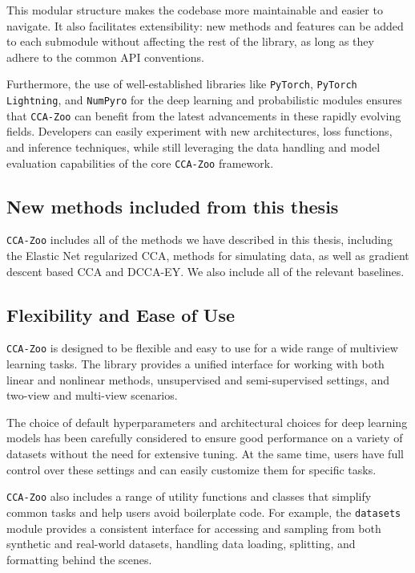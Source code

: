 This modular structure makes the codebase more maintainable and easier to navigate. It also facilitates extensibility: new methods and features can be added to each submodule without affecting the rest of the library, as long as they adhere to the common API conventions.

Furthermore, the use of well-established libraries like \texttt{PyTorch}, \texttt{PyTorch Lightning}, and \texttt{NumPyro} for the deep learning and probabilistic modules ensures that \texttt{CCA-Zoo} can benefit from the latest advancements in these rapidly evolving fields. Developers can easily experiment with new architectures, loss functions, and inference techniques, while still leveraging the data handling and model evaluation capabilities of the core \texttt{CCA-Zoo} framework.

\subsection{New methods included from this thesis}

\texttt{CCA-Zoo} includes all of the methods we have described in this thesis, including the Elastic Net regularized CCA, methods for simulating data, as well as gradient descent based CCA and DCCA-EY. We also include all of the relevant baselines.

\subsection{Flexibility and Ease of Use}

\texttt{CCA-Zoo} is designed to be flexible and easy to use for a wide range of multiview learning tasks. The library provides a unified interface for working with both linear and nonlinear methods, unsupervised and semi-supervised settings, and two-view and multi-view scenarios.

The choice of default hyperparameters and architectural choices for deep learning models has been carefully considered to ensure good performance on a variety of datasets without the need for extensive tuning. At the same time, users have full control over these settings and can easily customize them for specific tasks.

\texttt{CCA-Zoo} also includes a range of utility functions and classes that simplify common tasks and help users avoid boilerplate code. For example, the \texttt{datasets} module provides a consistent interface for accessing and sampling from both synthetic and real-world datasets, handling data loading, splitting, and formatting behind the scenes.

